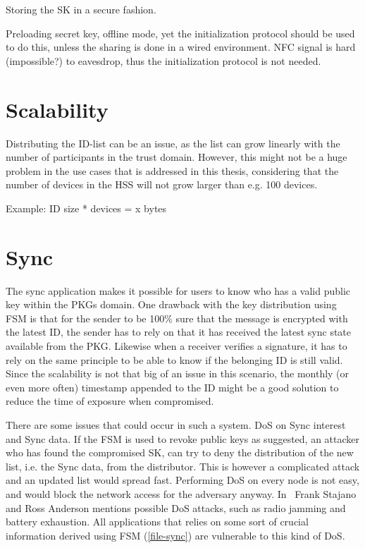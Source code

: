 Storing the \gls{SK} in a secure fashion.

Preloading secret key, offline mode, yet the initialization protocol should be used to do this, unless the sharing is done in a wired environment. 
\gls{NFC} signal is hard (impossible?) to eavesdrop, thus the initialization protocol is not needed. 


\section{Scalability}
Distributing the \gls{ID}-list can be an issue, as the list can grow linearly with the number of participants in the trust domain.
However, this might not be a huge problem in the use cases that is addressed in this thesis, considering that the number of devices in the \gls{HSS} will not grow larger than e.g. 100 devices. 

Example:
ID size * devices = x bytes 

\section{Sync}
The sync application makes it possible for users to know who has a valid public key within the \gls{PKG}s domain.
One drawback with the key distribution using \gls{FSM} is that for the sender to be 100\% sure that the message is encrypted with the latest \gls{ID}, the sender has to rely on that it has received the latest sync state available from the \gls{PKG}.
Likewise when a \gls{receiver} verifies a signature, it has to rely on the same principle to be able to know if the belonging \gls{ID} is still valid.
Since the scalability is not that big of an issue in this scenario, the monthly (or even more often) timestamp appended to the \gls{ID} might be a good solution to reduce the time of exposure when compromised.

There are some issues that could occur in such a system. 
\gls{DoS} on Sync \gls{interest} and Sync \gls{data}. 
If the \gls{FSM} is used to revoke public keys as suggested, an attacker who has found the compromised \gls{SK}, can try to deny the distribution of the new list, i.e. the Sync \gls{data}, from the distributor. 
This is however a complicated attack and an updated list would spread fast.
Performing \gls{DoS} on every node is not easy, and would block the network access for the adversary anyway.
In~\cite{DBLP:conf/spw/StajanoA99} Frank Stajano and Ross Anderson mentions possible \gls{DoS} attacks, such as radio jamming and battery exhaustion. 
All applications that relies on some sort of crucial information derived using \gls{FSM} (\autoref{file-sync}) are vulnerable to this kind of \gls{DoS}.

